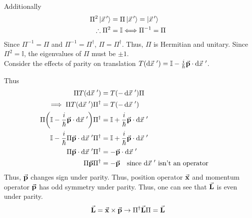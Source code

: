 \documentclass[12pt,a4paper,titlepage]{article}
\begin{document}
Additionally
\begin{equation}
\begin{aligned}
\Pi^{2}\ket{\vec{x}\,'}&=\Pi\ket{\vec{x}\,'}=\ket{\vec{x}\,'}\\
\therefore\Pi^{2}&=\mathbb{I}\Longleftrightarrow\Pi^{-1}=\Pi
\end{aligned}
\end{equation}
Since $\Pi^{-1}=\Pi$ and $\Pi^{-1}=\Pi^{\dagger}$, $\Pi=\Pi^{\dagger}$. Thus, $\Pi$ is Hermitian and unitary. Since $\Pi^{2}=\mathbb{I}$, the eigenvalues of $\Pi$ must be $\pm1$.\\

Consider the effects of parity on translation $T(\dd{\vec{x}}\,')=\mathbb{I}-\frac{i}{\hbar}\vec{\vb{p}}\cdot\dd{\vec{x}}\,'$.
\begin{center}
\end{center}
Thus
\begin{equation}
\begin{aligned}
\Pi T(\dd{\vec{x}}\,')&=T(-\dd{\vec{x}}\,')\Pi\\
\implies \Pi T(\dd{\vec{x}}\,')\Pi^{\dagger}&=T(-\dd{\vec{x}}\,')\\
\Pi\qty(\mathbb{I}-\frac{i}{\hbar}\vec{\vb{p}}\cdot\dd{\vec{x}}\,')\Pi^{\dagger}&=\mathbb{I}+\frac{i}{\hbar}\vec{\vb{p}}\cdot\dd{\vec{x}}\,'\\
\mathbb{I}-\frac{i}{\hbar}\Pi\vec{\vb{p}}\cdot\dd{\vec{x}}\,'\Pi^{\dagger}&=\mathbb{I}+\frac{i}{\hbar}\vec{\vb{p}}\cdot\dd{\vec{x}}\,'\\
\Pi\vec{\vb{p}}\cdot\dd{\vec{x}}\,'\Pi^{\dagger}&=-\vec{\vb{p}}\cdot\dd{\vec{x}}\,'\\
\Pi\vec{\vb{p}}\Pi^{\dagger}&=-\vec{\vb{p}}\qq{since $\dd{\vec{x}}\,'$ isn't an operator}
\end{aligned}
\end{equation}
Thus, $\vec{\vb{p}}$ changes sign under parity. Thus, position operator $\vec{\vb{x}}$ and momentum operator $\vec{\vb{p}}$ has odd symmetry under parity. Thus, one can see that $\vec{\vb{L}}$ is even under parity.
\begin{equation}
\vec{\vb{L}}=\vec{\vb{x}}\times\vec{\vb{p}}\rightarrow\Pi^{\dagger}\vec{\vb{L}}\Pi=\vec{\vb{L}}
\end{equation}
\end{document}
